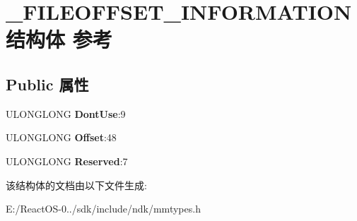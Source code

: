 \hypertarget{struct___f_i_l_e_o_f_f_s_e_t___i_n_f_o_r_m_a_t_i_o_n}{}\section{\+\_\+\+F\+I\+L\+E\+O\+F\+F\+S\+E\+T\+\_\+\+I\+N\+F\+O\+R\+M\+A\+T\+I\+O\+N结构体 参考}
\label{struct___f_i_l_e_o_f_f_s_e_t___i_n_f_o_r_m_a_t_i_o_n}
\subsection*{Public 属性}
\begin{DoxyCompactItemize}
\item 
\mbox{\label{struct___f_i_l_e_o_f_f_s_e_t___i_n_f_o_r_m_a_t_i_o_n_a7222b0258f2de94f95a7506246173652}} 
U\+L\+O\+N\+G\+L\+O\+NG {\bfseries Dont\+Use}\+:9
\item 
\mbox{\label{struct___f_i_l_e_o_f_f_s_e_t___i_n_f_o_r_m_a_t_i_o_n_a9636de8e64f6de4c9696c2aa0a54b220}} 
U\+L\+O\+N\+G\+L\+O\+NG {\bfseries Offset}\+:48
\item 
\mbox{\label{struct___f_i_l_e_o_f_f_s_e_t___i_n_f_o_r_m_a_t_i_o_n_aa49b0246e3e5b0299d0e53f4eb529514}} 
U\+L\+O\+N\+G\+L\+O\+NG {\bfseries Reserved}\+:7
\end{DoxyCompactItemize}


该结构体的文档由以下文件生成\+:\begin{DoxyCompactItemize}
\item 
E\+:/\+React\+O\+S-\/0../sdk/include/ndk/mmtypes.\+h\end{DoxyCompactItemize}
